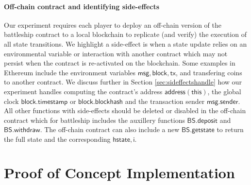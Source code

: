 \documentclass{llncs}
\newcommand{\hstate}{\mathsf{hstate}}
\newcommand{\monotoniccounter}{\mathsf{i}}
\newcommand{\battleshipdeposit}{\mathsf{BS.deposit}}
\newcommand{\battleshipwithdraw}{\mathsf{BS.withdraw}}
\newcommand{\battleshipgetstate}{\mathsf{BS.getstate}}
\begin{document}
	\paragraph{Off-chain contract and identifying side-effects} \label{sec:timers}
	
	Our experiment requires each player to deploy an off-chain version of the battleship contract to a local blockchain to replicate (and verify) the execution of all state transitions. 
	We highlight a side-effect is when a state update relies on an environmental variable or interaction with another contract which may not persist when the contract is re-activated on the blockchain. 
	Some examples in Ethereum include the environment variables $\mathsf{msg}, \mathsf{block}, \mathsf{tx}$, and transfering coins to another contract. 
	We discuss further in Section \ref{sec:sideffectshandle} how our experiment handles computing the contract's address $\mathsf{address(this)}$, the global clock $\mathsf{block.timestamp}$ or $\mathsf{block.blockhash}$ and the transaction sender $\mathsf{msg.sender}$. 
	All other functions with side-effects should be deleted or disabled in the off-chain contract which for battleship includes the auxillery functions $\battleshipdeposit$ and $\battleshipwithdraw$. 
	The off-chain contract can also include a new $\battleshipgetstate$ to return the full state and the corresponding $\hstate,\monotoniccounter$. 
	
	\section{Proof  of Concept Implementation}
	
\end{document}
